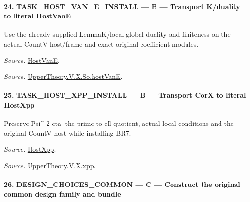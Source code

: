 \documentclass[11pt,a4paper]{article}
\numberwithin{equation}{section}
\theoremstyle{remark}\newtheorem{remark}[theorem]{Remark}
\begin{document}
\paragraph{24. TASK\_\allowbreak HOST\_\allowbreak VAN\_\allowbreak E\_\allowbreak INSTALL — B — Transport K/duality to literal HostVanE}

Use the already supplied LemmaK/local-global duality and finiteness on the actual CountV host/frame and exact original coefficient modules.

\emph{Source.} \href{https://github.com/CocoSgt/riemann-hypothesis-lean/blob/7cbf7a0c32fca1badf05931879a37c3f8a2b03b4/src/Development/AutomorphicArithmetic/AutomorphicVarieties/UnitaryThreeDeformations/HostNumber.lean#L9-L12}{HostVanE}.

\emph{Source.} \href{https://github.com/CocoSgt/riemann-hypothesis-lean/blob/7cbf7a0c32fca1badf05931879a37c3f8a2b03b4/src/Development/AutomorphicArithmetic/AutomorphicVarieties/LevelCohomology/SoHostVanE.lean#L11-L18}{UpperTheory.V.X.So.hostVanE}.



\paragraph{25. TASK\_\allowbreak HOST\_\allowbreak XPP\_\allowbreak INSTALL — B — Transport CorX to literal HostXpp}

Preserve Psi\textasciicircum{}-2 eta, the prime-to-ell quotient, actual local conditions and the original CountV host while installing BR7.

\emph{Source.} \href{https://github.com/CocoSgt/riemann-hypothesis-lean/blob/7cbf7a0c32fca1badf05931879a37c3f8a2b03b4/src/Development/AutomorphicArithmetic/AutomorphicVarieties/UnitaryThreeDeformations/HostNumber.lean#L14-L17}{HostXpp}.

\emph{Source.} \href{https://github.com/CocoSgt/riemann-hypothesis-lean/blob/7cbf7a0c32fca1badf05931879a37c3f8a2b03b4/src/Development/AutomorphicArithmetic/AutomorphicVarieties/LevelCohomology/Xpp.lean#L11-L84}{UpperTheory.V.X.xpp}.



\paragraph{26. DESIGN\_\allowbreak CHOICES\_\allowbreak COMMON — C — Construct the original common design family and bundle}
\end{document}
